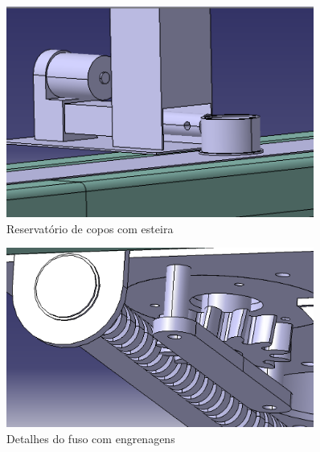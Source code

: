 \begin{apendicesenv}
\begin{figure}[H]
    \centering
    \includegraphics[width=0.9\textwidth]{figuras/estrutura/Recipiente dos Copos + Esteira.png}
    \caption{Reservatório de copos com esteira}
    \label{fig:reservatorioCopos}
\end{figure}

\begin{figure}[H]
    \centering
    \includegraphics[width=0.9\textwidth]{figuras/estrutura/Detalhe Fuso com Engrenagem.png}
    \caption{Detalhes do fuso com engrenagens}
    \label{fig:fusoEngrenagens}
\end{figure}   


\end{apendicesenv}
